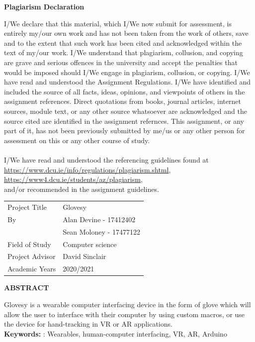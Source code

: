 \documentclass[12pt,a4paper,oneside]{book}
\theoremstyle{plain}
\numberwithin{equation}{chapter}
\begin{document}
\newpage
{}
\begin{center}
    \large\textbf{Plagiarism Declaration}
\end{center}
\noindent I/We declare that this material, which I/We now submit for assessment, is entirely my/our own work and has not been taken from the work of others, save and to the extent that such work has been cited and acknowledged within the text of my/our work. I/We understand that plagiarism, collusion, and copying are grave and serious offences in the university and accept the penalties that would be imposed should I/We engage in plagiarism, collusion, or copying. I/We have read and understood the Assignment Regulations. I/We have identified and included the source of all facts, ideas, opinions, and viewpoints of others in the assignment references. Direct quotations from books, journal articles, internet sources, module text, or any other source whatsoever are acknowledged and the source cited are identified in the assignment refernces. This assignment, or any part of it, has not been previously submitted by me/us or any other person for assessment on this or any other course of study. \\
\\
I/We have read and understood the referencing guidelines found at \\
\url{https://www.dcu.ie/info/regulations/plagiarism.shtml}, \\
\url{https://www4.dcu.ie/students/az/plagiarism}, \\
and/or recommended in the assignment guidelines.

\newpage
{}
\begin{table}[h]
	\begin{tabular}{ll}
		Project Title								   & Glovesy  \\
		By							   					  & Alan Devine - 17412402\\
															& Sean Moloney - 17477122\\
		Field of Study			  					 & Computer science \\
		Project Advisor								& David Sinclair \\
		Academic Years							  & 2020/2021 \\
	\end{tabular}
\end{table}
\begin{center}
  \large\textbf{ABSTRACT}\\
\end{center}
\noindent Glovesy is a wearable computer interfacing device in the form of glove which will allow the user to interface with their computer by using custom macros, or use the device for hand-tracking in VR or AR applications. \\
\noindent \textbf{Keywords:} : Wearables, human-computer interfacing, VR, AR, Arduino
\end{document}
